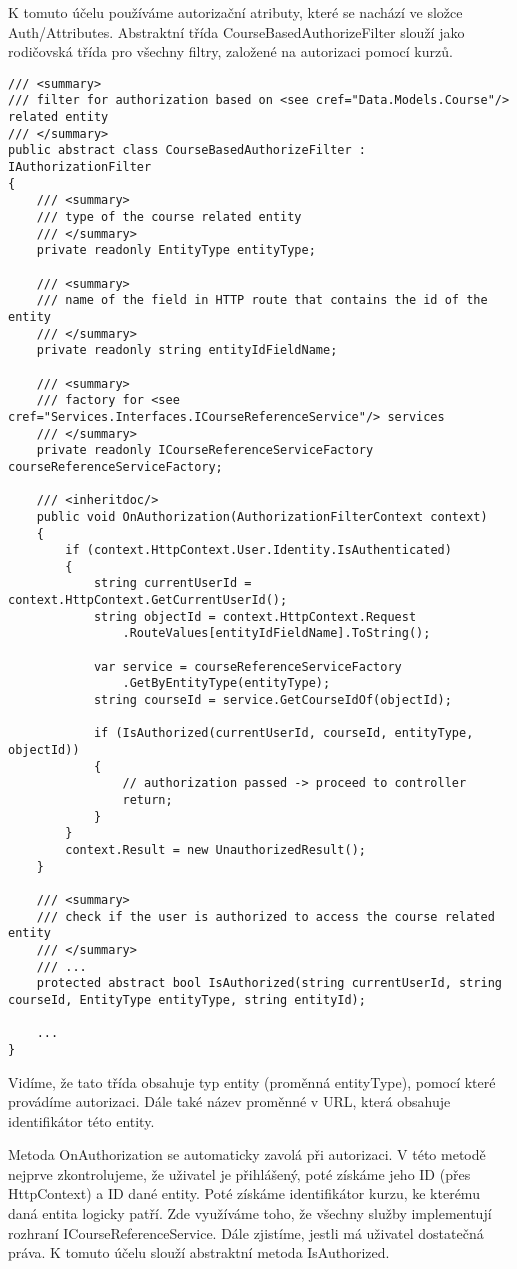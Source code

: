 K tomuto účelu používáme autorizační atributy, které se nachází ve složce Auth/Attributes. 
Abstraktní třída CourseBasedAuthorizeFilter slouží jako rodičovská třída pro všechny filtry, založené na autorizaci pomocí kurzů.

\begin{lstlisting}
/// <summary>
/// filter for authorization based on <see cref="Data.Models.Course"/> related entity
/// </summary>
public abstract class CourseBasedAuthorizeFilter : IAuthorizationFilter
{
	/// <summary>
	/// type of the course related entity
	/// </summary>
	private readonly EntityType entityType;
	
	/// <summary>
	/// name of the field in HTTP route that contains the id of the entity
	/// </summary>
	private readonly string entityIdFieldName;
	
	/// <summary>
	/// factory for <see cref="Services.Interfaces.ICourseReferenceService"/> services
	/// </summary>
	private readonly ICourseReferenceServiceFactory courseReferenceServiceFactory;

	/// <inheritdoc/>
	public void OnAuthorization(AuthorizationFilterContext context)
	{
		if (context.HttpContext.User.Identity.IsAuthenticated)
		{
			string currentUserId = context.HttpContext.GetCurrentUserId();
			string objectId = context.HttpContext.Request
				.RouteValues[entityIdFieldName].ToString();
			
			var service = courseReferenceServiceFactory
				.GetByEntityType(entityType);
			string courseId = service.GetCourseIdOf(objectId);
			
			if (IsAuthorized(currentUserId, courseId, entityType, objectId))
			{
				// authorization passed -> proceed to controller
				return;
			}			
		}
		context.Result = new UnauthorizedResult();
	}
	
	/// <summary>
	/// check if the user is authorized to access the course related entity
	/// </summary>
	/// ...
	protected abstract bool IsAuthorized(string currentUserId, string courseId, EntityType entityType, string entityId);
	
	...
}
\end{lstlisting}

Vidíme, že tato třída obsahuje typ entity (proměnná entityType), pomocí které provádíme autorizaci. Dále také název proměnné v URL, která obsahuje identifikátor této entity. 

Metoda OnAuthorization se automaticky zavolá při autorizaci. V této metodě nejprve zkontrolujeme, že uživatel je přihlášený, poté získáme jeho ID (přes HttpContext) a ID dané entity. Poté získáme identifikátor kurzu, ke kterému daná entita logicky patří. Zde využíváme toho, že všechny služby implementují rozhraní ICourseReferenceService. 
Dále zjistíme, jestli má uživatel dostatečná práva. K tomuto účelu slouží abstraktní metoda IsAuthorized. 

